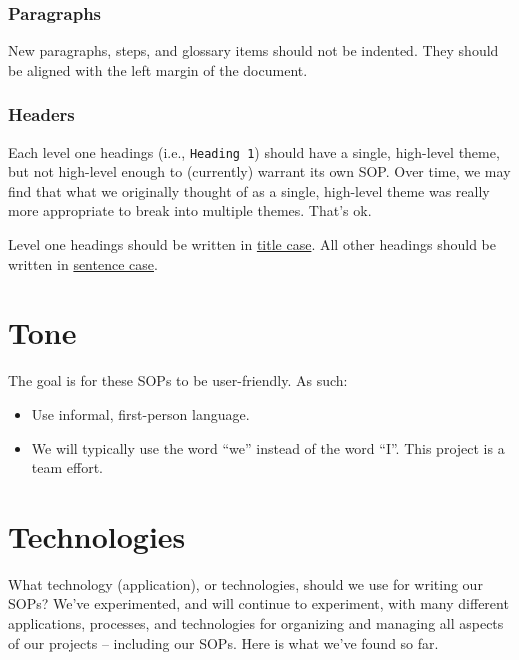 \documentclass[
  letterpaper,
  DIV=11,
  numbers=noendperiod]{scrreprt}
\providecommand{\tightlist}{%
  \setlength{\itemsep}{0pt}\setlength{\parskip}{0pt}}\usepackage{longtable,booktabs,array}
\begin{document}
\subsection*{Paragraphs}\label{paragraphs}

New paragraphs, steps, and glossary items should not be indented. They
should be aligned with the left margin of the document.

\subsection*{Headers}\label{headers}

Each level one headings (i.e., \texttt{Heading\ 1}) should have a
single, high-level theme, but not high-level enough to (currently)
warrant its own SOP. Over time, we may find that what we originally
thought of as a single, high-level theme was really more appropriate to
break into multiple themes. That's ok.

Level one headings should be written in
\href{https://en.wikipedia.org/wiki/Title_case}{title case}. All other
headings should be written in
\href{https://en.wiktionary.org/wiki/sentence_case}{sentence case}.

\chapter*{Tone}\label{sec-tone}


The goal is for these SOPs to be user-friendly. As such:

\begin{itemize}
\tightlist
\item
  Use informal, first-person language.
\item
  We will typically use the word ``we'' instead of the word ``I''. This
  project is a team effort.
\end{itemize}

\chapter*{Technologies}\label{sec-tech}


What technology (application), or technologies, should we use for
writing our SOPs? We've experimented, and will continue to experiment,
with many different applications, processes, and technologies for
organizing and managing all aspects of our projects -- including our
SOPs. Here is what we've found so far.
\end{document}
